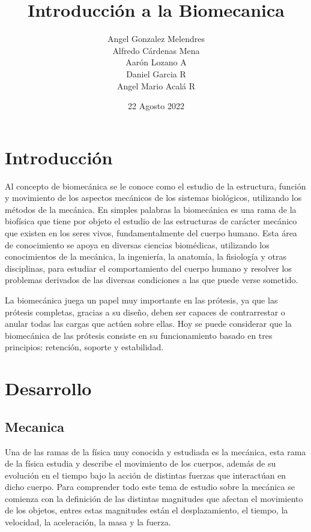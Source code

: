 \documentclass{article}
\title{Introducción a la Biomecanica}
\author{Angel Gonzalez Melendres \\Alfredo Cárdenas Mena\\Aarón Lozano A\\Daniel Garcia R\\Angel Mario Acalá R}
\date{22 Agosto 2022}
\begin{document}
\maketitle

\tableofcontents

\section{Introducción}

Al concepto de biomecánica se le conoce como el estudio de la estructura, función y movimiento de los aspectos mecánicos de los sistemas biológicos, utilizando los métodos de la mecánica. En simples palabras la biomecánica es una rama de la biofísica que tiene por objeto el estudio de las estructuras de carácter mecánico que existen en los seres vivos, fundamentalmente del cuerpo humano. Esta área de conocimiento se apoya en diversas ciencias biomédicas, utilizando los conocimientos de la mecánica, la ingeniería, la anatomía, la fisiología y otras disciplinas, para estudiar el comportamiento del cuerpo humano y resolver los problemas derivados de las diversas condiciones a las que puede verse sometido. 

La biomecánica juega un papel muy importante en las prótesis, ya que las prótesis completas, gracias a su diseño, deben ser capaces de contrarrestar o anular todas las cargas que actúen sobre ellas. Hoy se puede considerar que la biomecánica de las prótesis consiste en su funcionamiento basado en tres principios: retención, soporte y estabilidad. 

\section{Desarrollo}

\subsection{Mecanica}
Una de las ramas de la física muy conocida y estudiada es la mecánica, esta rama de la física estudia y describe el movimiento de los cuerpos, además de su evolución en el tiempo bajo la acción de distintas fuerzas que interactúan en dicho cuerpo. Para comprender todo este tema de estudio sobre la mecánica se comienza con la definición de las distintas magnitudes que afectan el movimiento de los objetos, entres estas magnitudes están el desplazamiento, el tiempo, la velocidad, la aceleración, la masa y la fuerza. 
\end{document}
